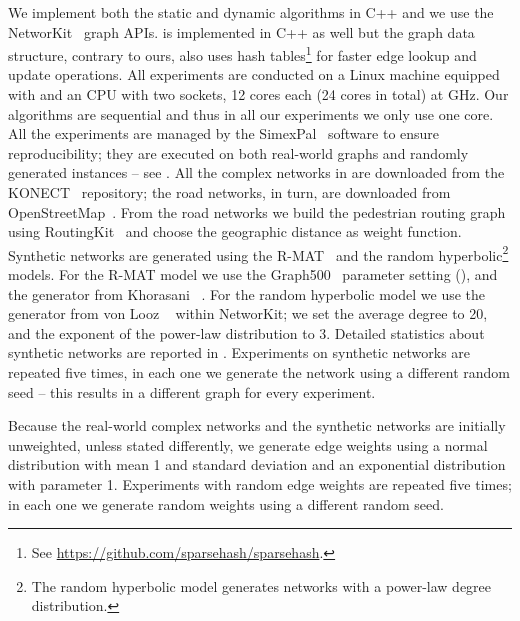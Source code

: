 We implement both the static and dynamic \suitor algorithms in C++ and we use the
NetworKit~\cite{DBLP:journals/netsci/StaudtSM16} graph APIs.
\dynmwmrandom is implemented in C++ as well but the graph data
structure, contrary to ours, also uses hash tables\footnote{See
\url{https://github.com/sparsehash/sparsehash}.} for faster edge lookup and
update operations. All experiments are conducted on a Linux machine
equipped with \RAM and an \cpumodel CPU with
two sockets, 12 cores each (24 cores in total) at  GHz. Our
algorithms are sequential and thus in all our experiments we only use one core.
All the experiments are managed by the
SimexPal~\cite{DBLP:journals/algorithms/AngrimanGLMNPT19} software to ensure
reproducibility; they are executed on both real-world graphs and randomly
generated instances -- see
. All the
complex networks in  are downloaded from the
KONECT~\cite{kunegis2013konect} repository; the road networks, in turn,
are downloaded from OpenStreetMap~\cite{OpenStreetMap}. From the road networks
we build the pedestrian routing graph using
RoutingKit~\cite{DBLP:journals/jea/DibbeltSW16} and choose the geographic
distance as weight function. Synthetic networks are generated using the
R-MAT~\cite{DBLP:conf/sdm/ChakrabartiZF04} and the random
hyperbolic\footnote{The random hyperbolic model generates networks with a
power-law degree distribution.} models. For the R-MAT model we use the
Graph500~\cite{murphy2010introducing} parameter setting (\ie \graphfh), and the
generator from Khorasani \etal~\cite{DBLP:conf/IEEEpact/KhorasaniGB15}. For the
random hyperbolic model we use the generator from von Looz
\etal~\cite{DBLP:conf/hpec/LoozOLM16} within NetworKit; we set the average
degree to 20, and the exponent of the power-law distribution to 3. Detailed
statistics about synthetic networks are reported in
. Experiments on synthetic networks are
repeated five times, in each one we generate the network using a different
random seed -- this results in a different graph for every experiment.

Because the real-world complex networks and the synthetic networks are
initially unweighted, unless stated differently,
we generate edge weights using a normal distribution with
mean 1 and standard deviation  and an exponential distribution
with parameter 1. Experiments with random edge weights are repeated five times;
in each one we generate random weights using a different random seed.


